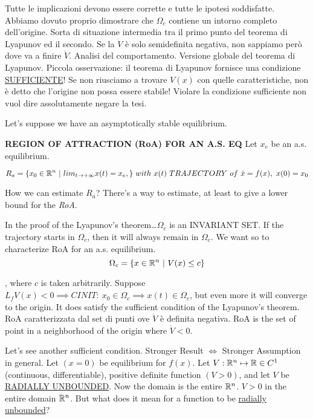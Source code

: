 Tutte le implicazioni devono essere corrette e tutte le ipotesi soddisfatte. Abbiamo dovuto proprio dimostrare che $\Omega_c$ contiene un intorno completo dell'origine. Sorta di situazione intermedia tra il primo punto del teorema di Lyapunov ed il secondo. Se la $\dot{V}$ è solo semidefinita negativa, non sappiamo però dove va a finire $\dot{V}$. Analisi del comportamento. Versione globale del teorema di Lyapunov. Piccola osservazione: il teorema di Lyapunov fornisce una condizione \underline{SUFFICIENTE}! Se non riusciamo a trovare $V(x)$ con quelle caratteristiche, non è detto che l'origine non possa essere stabile! Violare la condizione sufficiente non vuol dire assolutamente negare la tesi.

Let's suppose we have an asymptotically stable equilibrium.

\begin{defn}{\textbf{REGION OF ATTRACTION (RoA) FOR AN A.S. EQ}} \newline
Let $x_e$ be an a.s. equilibrium.

\[
	R_a = \{x_0 \in \R^n\ |\ lim_{t\to +\infty}{x(t)} = x_e,\}\ with\ x(t)\ TRAJECTORY\ of\ \dot{x}=f(x),\ x(0)=x_0
\]

How we can estimate $R_a$? There's a way to estimate, at least to give a lower bound for the \emph{RoA}. 

\end{defn}

In the proof of the Lyapunov's theorem\dots $\Omega_c$ is an INVARIANT SET. If the trajectory starts in $\Omega_c$, then it will always remain in $\Omega_c$. We want so to characterize RoA for an a.s. equilibrium.
\[
	\Omega_c = \{x \in \mathbb{R}^n\ |\ V(x) \leq c\}
\]

, where $c$ is taken arbitrarily. Suppose $L_fV(x) < 0 \implies CINIT:\ x_0 \in \Omega_c \implies x(t) \in \Omega_c$, but even more it will converge to the origin. It does satisfy the sufficient condition of the Lyapunov's theorem. RoA caratterizzata dal set di punti ove $\dot{V}$ è definita negativa. RoA is the set of point in a neighborhood of the origin where $\dot{V} < 0$. 

Let's see another sufficient condition. Stronger Result $\iff$ Stronger Assumption in general. Let $(x=0)$ be equilibrium for $f(x)$. Let $V:\mathbb{R}^n \mapsto \mathbb{R} \in C^1$ (continuous, differentiable), positive definite function $(V > 0)$, and let $V$ be \underline{RADIALLY UNBOUNDED}. Now the domain is the entire $\mathbb{R}^n$. $V > 0$ in the entire domain $\mathbb{R}^n$. But what does it mean for a function to be \underline{radially unbounded}?

